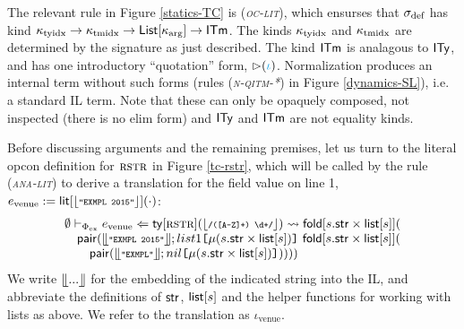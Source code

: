 \documentclass[9pt,preprint]{sigplanconf}
\newcommand{\rulename}[1]{({\textsc{\textsl{#1}}})}
\begin{document}
The relevant rule in Figure \ref{statics-TC} is \rulename{oc-lit}, which ensurses that $\sigma_\text{def}$ has kind $\kappa_\text{tyidx} \rightarrow \kappa_\text{tmidx} \rightarrow {\sf List}[\kappa_\text{arg}] \rightarrow {\sf ITm}$. The kinds $\kappa_\text{tyidx}$ and $\kappa_\text{tmidx}$ are determined by the signature as just described. The kind ${\sf ITm}$ is analagous to ${\sf ITy}$, and has one introductory ``quotation'' form, $\sqitm{\qcolor{\iota}}$. Normalization produces an internal term without such forms (rules \rulename{n-qitm-*} in Figure \ref{dynamics-SL}), i.e. a standard IL term. Note that these can only be opaquely composed, not inspected (there is no elim form) and ${\sf ITy}$ and ${\sf ITm}$ are not equality kinds.

Before discussing arguments and the remaining premises, let us turn to the literal opcon definition for $\textsc{rstr}$ in Figure \ref{tc-rstr}, which will be called by the rule \rulename{ana-lit} to derive a translation for the field value on line 1, $e_\text{venue} := \elit{\desugar{\concstr{EXMPL 2015}}}{\cdot}$: \footnotesize\[\begin{array}{l}\eana{\emptyset}{\Phi_\text{ex}}{e_\text{venue}}{\sty{\tcvar{rstr}}{\desugar{\concrx{([A-Z]+) \digit+}}}}{\ifold{s}{\keyw{str}\times\keyw{list}[s]}{\\
\quad \keyw{pair}(\llfloor\concstr{EXMPL 2015}\rrfloor; \iAp{\imu{s}{\keyw{str}\times\keyw{list}[s]}}{list1}~\ifold{s}{\keyw{str}\times\keyw{list}[s]}{\\
\quad\quad \keyw{pair}(\llfloor\concstr{EXMPL}\rrfloor; \iAp{\imu{s}{\keyw{str}\times\keyw{list}[s]}}{nil})})}}
\end{array}\]
\normalsize
We write $\llfloor{...}\rrfloor$ for the embedding of the indicated string into the IL, and abbreviate the definitions of ${\sf str}$, ${\sf list}[s]$ and the helper functions for working with lists as above. We refer to the translation as $\iota_\text{venue}$.
\end{document}
